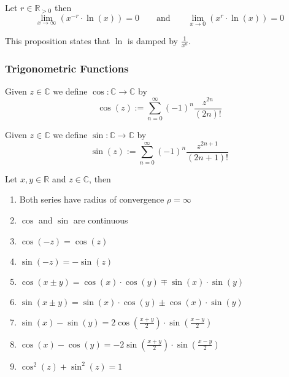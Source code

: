 \begin{proposition}
   Let \(r \in \mathbb{R}_{>0}\) then
   \[\lim_{x \to \infty} \left(x^{-r} \cdot \ln(x)\right) = 0 \qquad\text{and}\qquad \lim_{x \to 0} \left(x^r \cdot \ln(x)\right) = 0\]
\end{proposition}
\begin{remark}
   This proposition states that \(\ln\) is damped by \(\frac{1}{x^n}\).
\end{remark}

\subsubsection{Trigonometric Functions}
\begin{definition}[Cosine]
   Given \(z \in \mathbb{C}\) we define \(\cos: \mathbb{C} \to \mathbb{C}\) by
   \[\cos(z) := \sum_{n=0}^\infty (-1)^n \frac{z^{2n}}{(2n)!}\]
\end{definition}

\begin{definition}[Sine]
   Given \(z \in \mathbb{C}\) we define \(\sin: \mathbb{C} \to \mathbb{C}\) by
   \[\sin(z) := \sum_{n=0}^\infty (-1)^n \frac{z^{2n + 1}}{(2n+1)!}\]
\end{definition}

\begin{proposition}[Properties]
   Let \(x, y \in \mathbb{R}\) and \(z \in \mathbb{C}\), then
   \begin{enumerate}[label=\roman*, align=Center]
      \item Both series have radius of convergence \(\rho = \infty\)
      \item \(\cos\) and \(\sin\) are continuous
      \item \(\cos(-z) = \cos(z)\)
      \item \(\sin(-z) = -\sin(z)\)
      \item \(\cos(x \pm y) = \cos(x) \cdot \cos(y) \mp \sin(x) \cdot \sin(y)\)
      \item \(\sin(x \pm y) = \sin(x) \cdot \cos(y) \pm \cos(x) \cdot \sin(y)\)
      \item \(\sin(x) - \sin(y) = 2 \cos\left(\frac{x+y}{2}\right) \cdot \sin\left(\frac{x-y}{2}\right)\)
      \item \(\cos(x) - \cos(y) = -2 \sin\left(\frac{x+y}{2}\right) \cdot \sin\left(\frac{x-y}{2}\right)\)
      \item \(\cos^2(z) + \sin^2(z) = 1\)
   \end{enumerate}
\end{proposition}

